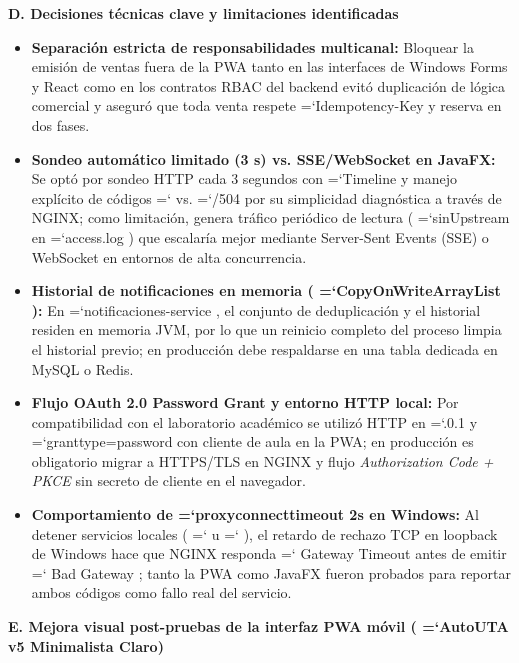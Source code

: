 \documentclass[11pt,a4paper]{article}
\renewcommand{\_}{\oldunderscore\allowbreak}
\DeclareRobustCommand{\texttt}[1]{%
  {\upshape\ttfamily\fontsize{9}{10.8}\selectfont\hyphenchar\font=`\-\relax #1}%
}
\begin{document}
\vspace{0.2cm}
\noindent\textbf{D. Decisiones técnicas clave y limitaciones identificadas}

\begin{itemize}[leftmargin=*,itemsep=2pt,topsep=1pt]
  \item \textbf{Separación estricta de responsabilidades multicanal:} Bloquear la emisión de ventas fuera de la PWA tanto en las interfaces de Windows Forms y React como en los contratos RBAC del backend evitó duplicación de lógica comercial y aseguró que toda venta respete \texttt{Idempotency-Key} y reserva en dos fases.
  \item \textbf{Sondeo automático limitado (3 s) vs. SSE/WebSocket en JavaFX:} Se optó por sondeo HTTP cada 3 segundos con \texttt{Timeline} y manejo explícito de códigos \texttt{200} vs. \texttt{502/504} por su simplicidad diagnóstica a través de NGINX; como limitación, genera tráfico periódico de lectura (\texttt{sinUpstream} en \texttt{access.log}) que escalaría mejor mediante Server-Sent Events (SSE) o WebSocket en entornos de alta concurrencia.
  \item \textbf{Historial de notificaciones en memoria (\texttt{CopyOnWriteArrayList}):} En \texttt{notificaciones-service}, el conjunto de deduplicación y el historial residen en memoria JVM, por lo que un reinicio completo del proceso limpia el historial previo; en producción debe respaldarse en una tabla dedicada en MySQL o Redis.
  \item \textbf{Flujo OAuth 2.0 Password Grant y entorno HTTP local:} Por compatibilidad con el laboratorio académico se utilizó HTTP en \texttt{127.0.0.1} y \texttt{grant\_type=\allowbreak{}password} con cliente de aula en la PWA; en producción es obligatorio migrar a HTTPS/TLS en NGINX y flujo \textit{Authorization Code + PKCE} sin secreto de cliente en el navegador.
  \item \textbf{Comportamiento de \texttt{proxy\_connect\_timeout 2s} en Windows:} Al detener servicios locales (\texttt{8002} u \texttt{8081}), el retardo de rechazo TCP en loopback de Windows hace que NGINX responda \texttt{504 Gateway Timeout} antes de emitir \texttt{502 Bad Gateway}; tanto la PWA como JavaFX fueron probados para reportar ambos códigos como fallo real del servicio.
\end{itemize}

\vspace{0.2cm}
\noindent\textbf{E. Mejora visual post-pruebas de la interfaz PWA móvil (\texttt{AutoUTA} v5 Minimalista Claro)}
\end{document}
